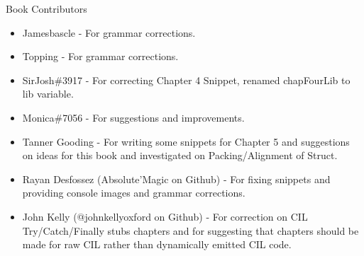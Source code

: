 \large Book Contributors \newline
\begin{itemize}
	\item Jamesbascle - For grammar corrections.
	\item Topping - For grammar corrections.
	\item SirJosh\#3917 - For correcting Chapter 4 Snippet, renamed chapFourLib to lib variable.
	\item Monica\#7056 - For suggestions and improvements.
	\item Tanner Gooding - For writing some snippets for Chapter 5 and suggestions on ideas for this book and investigated on Packing/Alignment of Struct.
	\item Rayan Desfossez (Absolute'Magic on Github) - For fixing snippets and providing console images and grammar corrections.
	\item John Kelly (@johnkellyoxford on Github) - For correction on CIL Try/Catch/Finally stubs chapters and for suggesting that chapters should be made for raw CIL rather than dynamically emitted CIL code.
\end{itemize}

\newpage
